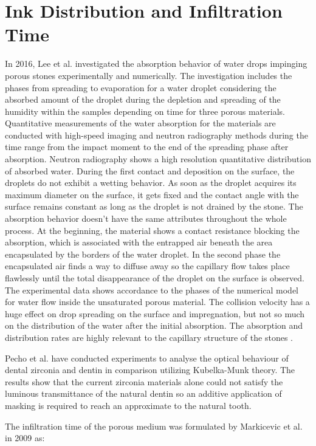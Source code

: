 \section{Ink Distribution and Infiltration Time}
In 2016, Lee et al. investigated the absorption behavior of water drops impinging porous stones experimentally and numerically. The investigation includes the phases from spreading to evaporation for a water droplet considering the absorbed amount of the droplet during the depletion and spreading of the humidity within the samples depending on time for three porous materials. Quantitative measurements of the water absorption for the materials are conducted with high-speed imaging and neutron radiography methods during the time range from the impact moment to the end of the spreading phase after absorption. Neutron radiography shows a high resolution quantitative distribution of absorbed water. During the first contact and deposition on the surface, the droplets do not exhibit a wetting behavior.  As soon as the droplet acquires its maximum diameter on the surface, it gets fixed and the contact angle with the surface remains constant as long as the droplet is not drained by the stone. The absorption behavior doesn’t have the same attributes throughout the whole process. At the beginning, the material shows a contact resistance blocking the absorption, which is associated with the entrapped air beneath the area encapsulated by the borders of the water droplet. In the second phase the encapsulated air finds a way to diffuse away so the capillary flow takes place flawlessly until the total disappearance of the droplet on the surface is observed. The experimental data shows accordance to the phases of the numerical model for water flow inside the unsaturated porous material. The collision velocity has a huge effect on drop spreading on the surface and impregnation, but not so much on the distribution of the water after the initial absorption. The absorption and distribution rates are highly relevant to the capillary structure of the stones \citep{lee2016absorption}.


Pecho et al. have conducted experiments to analyse the optical behaviour of dental zirconia and dentin in comparison utilizing Kubelka-Munk theory. The results show that the current zirconia materials alone could not satisfy the luminous transmittance of the natural dentin so an additive application of masking is required to reach an approximate to the natural tooth\citep{pecho2015optical}.

The infiltration time of the porous medium was formulated by Markicevic et al. in 2009 as:


